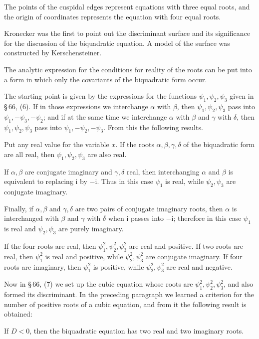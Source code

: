 \documentclass[11pt]{article}
\providecommand{\ii}{\mathrm{i}}
\begin{document}
The points of the cuspidal edges represent equations with three equal roots, and the origin of coordinates represents the equation with four equal roots.

Kronecker was the first to point out the discriminant surface and its significance for the discussion of the biquadratic equation. A model of the surface was constructed by Kerschensteiner.

The analytic expression for the conditions for reality of the roots can be put into a form in which only the covariants of the biquadratic form occur.

The starting point is given by the expressions for the functions $\psi_1,\psi_2,\psi_3$ given in \S\,66, (6). If in those expressions we interchange $\alpha$ with $\beta$, then $\psi_1,\psi_2,\psi_3$ pass into $\psi_1,-\psi_3,-\psi_2$; and if at the same time we interchange $\alpha$ with $\beta$ and $\gamma$ with $\delta$, then $\psi_1,\psi_2,\psi_3$ pass into $\psi_1,-\psi_2,-\psi_3$. From this the following results.

Put any real value for the variable $x$. If the roots $\alpha,\beta,\gamma,\delta$ of the biquadratic form are all real, then $\psi_1,\psi_2,\psi_3$ are also real.

If $\alpha,\beta$ are conjugate imaginary and $\gamma,\delta$ real, then interchanging $\alpha$ and $\beta$ is equivalent to replacing $\ii$ by $-\ii$. Thus in this case $\psi_1$ is real, while $\psi_2,\psi_3$ are conjugate imaginary.

Finally, if $\alpha,\beta$ and $\gamma,\delta$ are two pairs of conjugate imaginary roots, then $\alpha$ is interchanged with $\beta$ and $\gamma$ with $\delta$ when $\ii$ passes into $-\ii$; therefore in this case $\psi_1$ is real and $\psi_2,\psi_3$ are purely imaginary.

If the four roots are real, then $\psi_1^2,\psi_2^2,\psi_3^2$ are real and positive. If two roots are real, then $\psi_1^2$ is real and positive, while $\psi_2^2,\psi_3^2$ are conjugate imaginary. If four roots are imaginary, then $\psi_1^2$ is positive, while $\psi_2^2,\psi_3^2$ are real and negative.

Now in \S\,66, (7) we set up the cubic equation whose roots are $\psi_1^2,\psi_2^2,\psi_3^2$, and also formed its discriminant. In the preceding paragraph we learned a criterion for the number of positive roots of a cubic equation, and from it the following result is obtained:

If $D<0$, then the biquadratic equation has two real and two imaginary roots.
\end{document}
